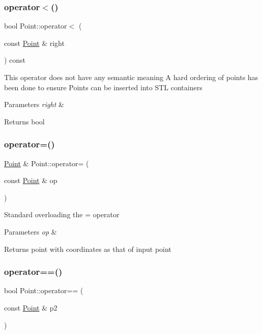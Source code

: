 \subsubsection{\texorpdfstring{operator$<$()}{operator<()}}
{\footnotesize\ttfamily bool Point\+::operator$<$ (\begin{DoxyParamCaption}\item[{const \hyperlink{classPoint}{Point} \&}]{right }\end{DoxyParamCaption}) const}

This operator does not have any semantic meaning A hard ordering of points has been done to ensure Points can be inserted into S\+TL containers 
\begin{DoxyParams}{Parameters}
{\em right} & \\
\hline
\end{DoxyParams}
\begin{DoxyReturn}{Returns}
bool 
\end{DoxyReturn}
\mbox{\label{classPoint_a2e142edc132377fdc6873f6549daab2d}} 
\subsubsection{\texorpdfstring{operator=()}{operator=()}}
{\footnotesize\ttfamily \hyperlink{classPoint}{Point} \& Point\+::operator= (\begin{DoxyParamCaption}\item[{const \hyperlink{classPoint}{Point} \&}]{op }\end{DoxyParamCaption})}

Standard overloading the = operator 
\begin{DoxyParams}{Parameters}
{\em op} & \\
\hline
\end{DoxyParams}
\begin{DoxyReturn}{Returns}
point with coordinates as that of input point 
\end{DoxyReturn}
\mbox{\label{classPoint_ac7bc64b9a683d5fb35780c739779f2fc}} 
\subsubsection{\texorpdfstring{operator==()}{operator==()}}
{\footnotesize\ttfamily bool Point\+::operator== (\begin{DoxyParamCaption}\item[{const \hyperlink{classPoint}{Point} \&}]{p2 }\end{DoxyParamCaption})}


